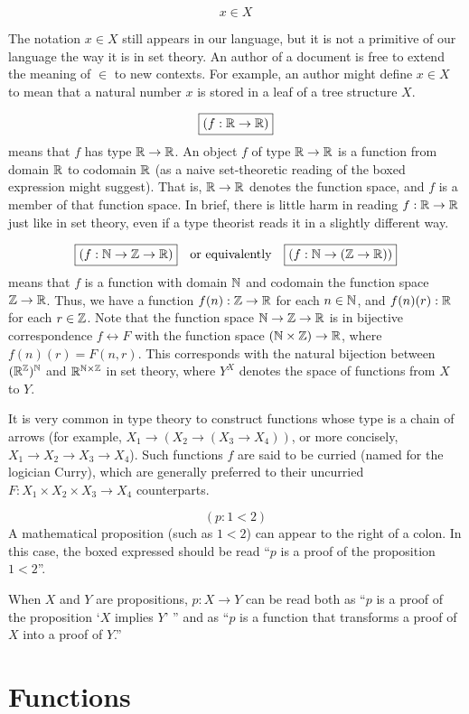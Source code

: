 \documentclass[12pt]{article}
\numberwithin{definition}{section}
\begin{document}
\[
\boxed{x\in X}
\]

The notation $x\in X$ still appears in our language, but it is not a
primitive of our language the way it is in set theory.  An author of a
document is free to extend the meaning of $\in$ to new contexts.  For
example, an author might define $x\in X$ to mean that a natural number $x$
is stored in a leaf of a tree structure $X$.

\[
\boxed{(f : {\mathbb R} \to {\mathbb R})}
\]
means that $f$ has type ${\mathbb R}\to{\mathbb R}$.  An object $f$ of type
${\mathbb R}\to{\mathbb R}$ is a function from domain ${\mathbb R}$ to codomain ${\mathbb R}$
(as a naive set-theoretic reading of the boxed expression might
suggest).  That is, ${\mathbb R}\to{\mathbb R}$ denotes the function space, and
$f$ is a member of that function space.  In brief, there
is little harm in reading $f :{\mathbb R}\to{\mathbb R}$ just like in set theory,
even if a type theorist reads it in a slightly different way.

\[
\boxed{(f : {\mathbb N} \to{\mathbb Z} \to {\mathbb R})}\quad \text{or equivalently}\quad \boxed{(f:{\mathbb N}\to({\mathbb Z}\to{\mathbb R}))}
\]
means that $f$ is a function with domain ${\mathbb N}$ and codomain the
function space ${\mathbb Z}\to{\mathbb R}$.  Thus, we have a function
$f(n):{\mathbb Z}\to{\mathbb R}$ for each $n\in {\mathbb N}$, and $f(n)(r):{\mathbb R}$ for each
$r\in{\mathbb Z}$.  Note that the function space ${\mathbb N}\to{\mathbb Z}\to{\mathbb R}$ is in
bijective correspondence $f\leftrightarrow F$ with the function space
$({\mathbb N}\times {\mathbb Z})\to{\mathbb R}$, where $f(n)(r) = F(n,r)$. This
corresponds with the natural bijection between $({\mathbb R}^{{\mathbb Z}})^{{\mathbb N}}$
and ${\mathbb R}^{{\mathbb N}\times{\mathbb Z}}$ in set theory, where $Y^X$ denotes the space
of functions from $X$ to $Y$.


It is very common in type theory to construct functions whose type is
a chain of arrows (for example, $X_1\to (X_2\to (X_3 \to X_4))$, or
more concisely, $X_1\to X_2\to X_3 \to X_4$).  Such functions $f$ are
said to be curried (named for the logician Curry), which are generally
preferred to their uncurried $F:X_1\times X_2\times X_3\to X_4$
counterparts.

\[
\boxed{(p : 1 < 2)}
\]
A mathematical proposition (such as $1<2$) can appear to the right
of a colon.  In this case, the boxed expressed should be read
``$p$ is a proof of the proposition $1<2$''.  

When $X$ and $Y$ are
propositions, $p: X\to Y$ can be read both as ``$p$ is a proof
of the proposition `$X$ implies $Y$' ''  and as ``$p$ is a function
that transforms a proof of $X$ into a proof of $Y$.''

\section{Functions}
\end{document}
